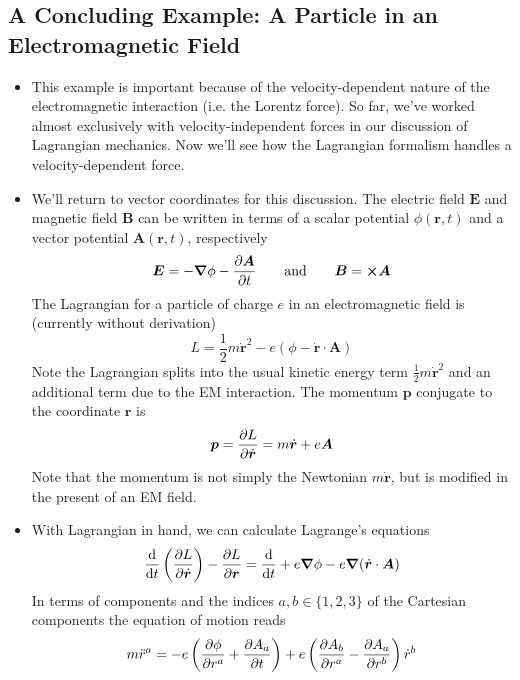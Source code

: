 \documentclass[11pt, a4paper]{article}
\newcommand{\eqtext}[1]{\qquad \text{#1} \qquad}
\newcommand{\bdot}[1]{\dot{\bm{#1}}} %
\begin{document}
\subsection{A Concluding Example: A Particle in an Electromagnetic Field} \label{ssec:lag:em_lag}
\begin{itemize}
	\item This example is important because of the velocity-dependent nature of the electromagnetic interaction (i.e. the Lorentz force). So far, we've worked almost exclusively with velocity-independent forces in our discussion of Lagrangian mechanics. Now we'll see how the Lagrangian formalism handles a velocity-dependent force.
	
	\item We'll return to vector coordinates for this discussion. The electric field $ \bm{E} $ and magnetic field $ \bm{B} $ can be written in terms of a scalar potential $ \phi(\bm{r}, t) $ and a vector potential $ \bm{A}(\bm{r}, t) $, respectively
	\begin{equation*}
		 \bm{E} = -\grad{\phi} - \pdv{\bm{A}}{t} \eqtext{and} \bm{B} = \cross \bm{A} 
	\end{equation*} 
	The Lagrangian for a particle of charge $ e $ in an electromagnetic field is (currently without derivation)
	\begin{equation*}
		L = \frac{1}{2}m \bdot{r}^{2} - e(\phi - \bdot{r}\cdot \bm{A})
	\end{equation*}
	Note the Lagrangian splits into the usual kinetic energy term $ \frac{1}{2}m \bdot{r}^{2} $ and an additional term due to the EM interaction. The momentum $ \bm{p} $ conjugate to the coordinate $ \bm{r} $ is
	\begin{equation*}
		\bm{p} = \pdv{L}{\bdot{r}} = m \bdot{r} + e\bm{A}
	\end{equation*}
	Note that the momentum is not simply the Newtonian $ m \bdot{r} $, but is modified in the present of an EM field.
	
	\item With Lagrangian in hand, we can calculate Lagrange's equations
	\begin{equation*}
		\dv{}{t}\left(\pdv{L}{\bdot{r}}\right) - \pdv{L}{\bm{r}} = \dv{}{t}(m \bdot{r} + e\bm{A}) + e \grad{\phi} - e  \grad (\bdot{r}\cdot \bm{A})
	\end{equation*}
	In terms of components and the indices $ a, b \in \{1, 2, 3\} $ of the Cartesian components the equation of motion reads
	\begin{equation*}
		m\ddot{r}^{a} = -e\left(\pdv{\phi}{r^{a}} + \pdv{A_{a}}{t} \right) + e \left(\pdv{A_{b}}{r^{a}} - \pdv{A_{a}}{r^{b}} \right)\dot{r}^{b}
	\end{equation*}
	

\end{itemize}
\end{document}
